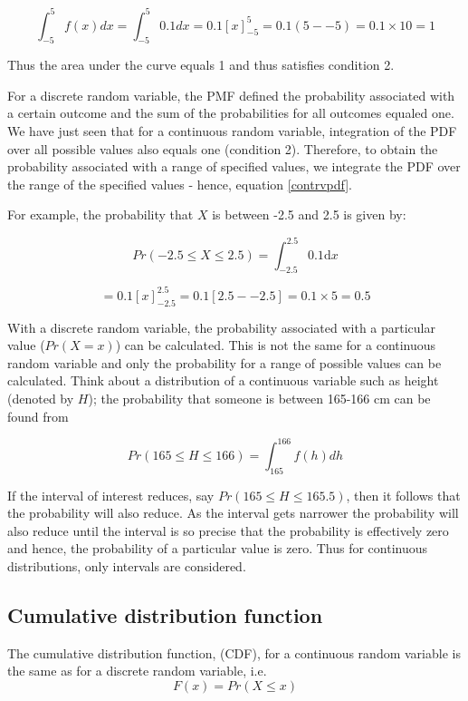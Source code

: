 \documentclass[
  oneside]{krantz}
\begin{document}
\[\int _{-5}^{5} f(x)dx = \int _{-5}^{5} 0.1 dx = 0.1[x ]_{-5}^5 = 0.1(5 - -5) = 0.1 \times 10 = 1\]

Thus the area under the curve equals 1 and thus satisfies condition 2.

For a discrete random variable, the PMF defined the probability associated with a certain outcome and the sum of the probabilities for all outcomes equaled one. We have just seen that for a continuous random variable, integration of the PDF over all possible values also equals one (condition 2). Therefore, to obtain the probability associated with a range of specified values, we integrate the PDF over the range of the specified values - hence, equation \ref{contrvpdf}.

For example, the probability that \(X\) is between -2.5 and 2.5 is given by:

\[Pr(-2.5 \le X \le 2.5) = \int_{-2.5}^{2.5} 0.1 \mathrm{d}x \]

\[ = 0.1[x]_{-2.5}^{2.5} = 0.1[2.5 - -2.5] = 0.1 \times 5 = 0.5\]

With a discrete random variable, the probability associated with a particular value (\(Pr(X=x)\)) can be calculated. This is not the same for a continuous random variable and only the probability for a range of possible values can be calculated. Think about a distribution of a continuous variable such as height (denoted by \(H\)); the probability that someone is between 165-166 cm can be found from

\[Pr(165 \le H \le 166) = \int_{165}^{166} f(h)dh \]

If the interval of interest reduces, say \(Pr(165 \le H \le 165.5)\), then it follows that the probability will also reduce. As the interval gets narrower the probability will also reduce until the interval is so precise that the probability is effectively zero and hence, the probability of a particular value is zero. Thus for continuous distributions, only intervals are considered.

\hypertarget{cumulative-distribution-function-1}{%
\subsection{Cumulative distribution function}\label{cumulative-distribution-function-1}}

The cumulative distribution function, (CDF), for a continuous random variable is the same as for a discrete random variable, i.e.~
\[ F(x) = Pr(X \leq x) \]
\end{document}
